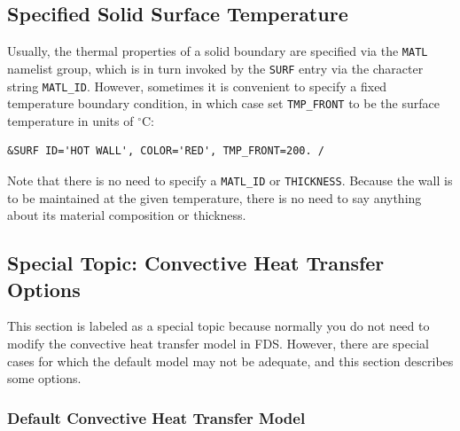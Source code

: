 \documentclass[11pt]{book}
\newcommand{\ct}{\tt\small}
\begin{document}
\subsection{Specified Solid Surface Temperature}
\label{info:specified_temperature}

Usually, the thermal properties of a solid boundary are specified via the
{\ct MATL} namelist group, which is in turn invoked by the {\ct SURF} entry via
the character string {\ct MATL\_ID}. However, sometimes it is convenient to
specify a fixed temperature boundary condition, in which case set
{\ct TMP\_FRONT} to be the surface temperature in units of $^\circ$C:

\footnotesize
\begin{verbatim}
&SURF ID='HOT WALL', COLOR='RED', TMP_FRONT=200. /
\end{verbatim}
\normalsize

\noindent
Note that there is no need to specify a {\ct MATL\_ID} or {\ct THICKNESS}. Because the wall is to be maintained at the given temperature,
there is no need to say anything about its material composition or thickness.



\subsection{Special Topic: Convective Heat Transfer Options}
\label{info:convection}

This section is labeled as a special topic because normally you do not need to modify the convective heat transfer
model in FDS. However, there are special cases for which the default model may not be adequate, and this section
describes some options.

\subsubsection{Default Convective Heat Transfer Model}
\end{document}
